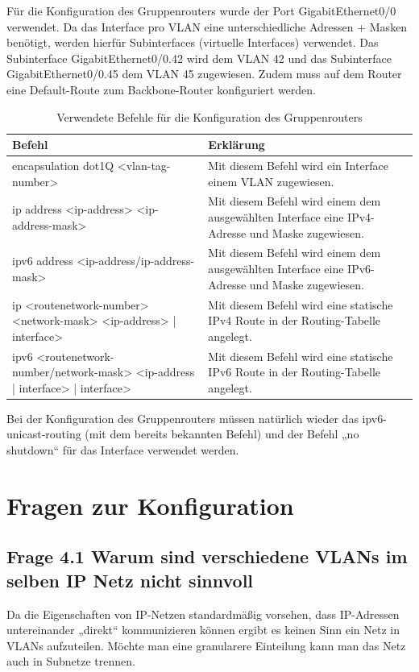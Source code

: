 \documentclass{article}
\begin{document}
Für die Konfiguration des Gruppenrouters wurde der Port GigabitEthernet0/0 verwendet. Da das Interface pro VLAN eine unterschiedliche Adressen + Masken benötigt, werden hierfür Subinterfaces (virtuelle Interfaces) verwendet. Das Subinterface GigabitEthernet0/0.42 wird dem VLAN 42 und das Subinterface GigabitEthernet0/0.45 dem VLAN 45 zugewiesen. Zudem muss auf dem Router eine Default-Route zum Backbone-Router konfiguriert werden.

\begin{table}[htbp]
    \centering
    \begin{tabularx}{\textwidth}{|X|X|}
        \toprule
        \textbf{Befehl} & \textbf{Erklärung} \\
        \midrule
        encapsulation dot1Q <vlan-tag-number> & Mit diesem Befehl wird ein Interface einem VLAN zugewiesen.\\
        \hline
        ip address <ip-address> <ip-address-mask> & Mit diesem Befehl wird einem dem ausgewählten Interface eine IPv4-Adresse und Maske zugewiesen.\\
        \hline
        ipv6 address <ip-address/ip-address-mask> & Mit diesem Befehl wird einem dem ausgewählten Interface eine IPv6-Adresse und Maske zugewiesen.\\
        \hline
        ip <routenetwork-number> <network-mask> <ip-address> | interface> & Mit diesem Befehl wird eine statische IPv4 Route in der Routing-Tabelle angelegt.\\
        \hline
        ipv6 <routenetwork-number/network-mask> <ip-address | interface> | interface> & Mit diesem Befehl wird eine statische IPv6 Route in der Routing-Tabelle angelegt.\\
        \bottomrule
    \end{tabularx}
    \caption{Verwendete Befehle für die Konfiguration des Gruppenrouters}
    \label{tab:commands}
\end{table}
\noindent Bei der Konfiguration des Gruppenrouters müssen natürlich wieder das ipv6-unicast-routing (mit dem bereits bekannten Befehl) und der Befehl „no shutdown“ für das Interface verwendet werden.

\section{Fragen zur Konfiguration}

\subsection*{Frage 4.1 \normalfont Warum sind verschiedene VLANs im selben IP Netz nicht sinnvoll}
Da die Eigenschaften von IP-Netzen standardmäßig vorsehen, dass IP-Adressen untereinander „direkt“ kommunizieren können ergibt es keinen Sinn ein Netz in VLANs aufzuteilen. Möchte man eine granularere Einteilung kann man das Netz auch in Subnetze trennen.
\end{document}
